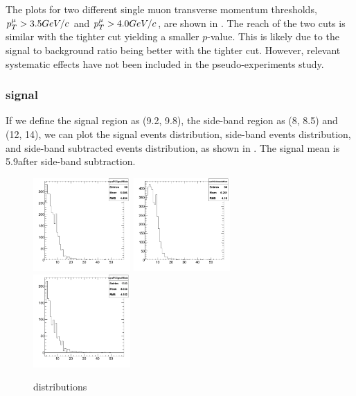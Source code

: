 The plots for two different single muon transverse momentum thresholds, $p_T^\mu>3.5GeV/c$ and $p_T^\mu>4.0GeV/c$, are shown in .
%
The reach of the two cuts is similar with the tighter cut yielding a smaller $p$-value. 
This is likely due to the signal to background ratio being better with the tighter cut. 
However, relevant systematic effects have not been included in the pseudo-experiments study.

\subsubsection{\PgUa signal \pt}
If we define the \PgUa signal region as (9.2, 9.8), the side-band region as (8, 8.5) and (12, 14), we can plot the signal events \pt distribution, side-band events \pt distribution, and side-band subtracted events \pt distribution, as shown in . The \PgUa signal mean \pt is 5.9\GeVc after side-band subtraction.
\begin{figure}[h!]
 \begin{center}
   \includegraphics[angle=0,width=0.33\textwidth]{chap_YInPbPbColl2011_figures/upsPtSignalHisto}
   \includegraphics[angle=0,width=0.33\textwidth]{chap_YInPbPbColl2011_figures/upsPtSidebandsHisto}
   \includegraphics[angle=0,width=0.33\textwidth]{chap_YInPbPbColl2011_figures/upsPtSubtracted}
   \caption{\PgUa \pt distributions} %
   \label{fig:upsPt}
 \end{center}
\end{figure}


